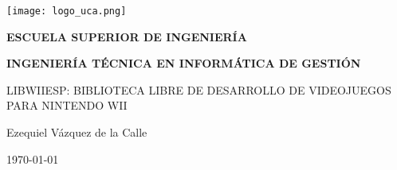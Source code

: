 



\begin{titlepage}

  \begin{center}

    \texttt{[image: logo\_uca.png]} \\
    
    \vspace{2.0cm}
    
    \LARGE{\textbf{ESCUELA SUPERIOR DE INGENIERÍA}} \\
    
    \vspace{1.0cm}
    
    \Large{\textbf{INGENIERÍA TÉCNICA EN INFORMÁTICA DE GESTIÓN}} \\
    
    \vspace{3.0cm}
    
    \Large{LIBWIIESP: BIBLIOTECA LIBRE DE DESARROLLO DE VIDEOJUEGOS PARA NINTENDO WII} \\
    
    \vspace{2.0cm}
    
    \Large{Ezequiel Vázquez de la Calle} \\
  
    \vspace{0.5cm}

    \large{\today}
    
  \end{center}
\end{titlepage}
